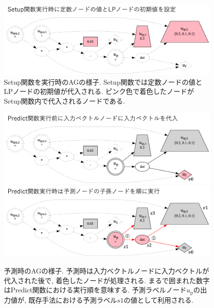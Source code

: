\documentclass[11pt,oneside,openany,report]{jsbook}
\begin{document}
\begin{figure}
  \centering
  \includegraphics[width=14cm]{mgg_automl_zero_vag/ag/setup.png}
  \caption{Setup関数を実行時のAGの様子. Setup関数では定数ノードの値とLPノードの初期値が代入される. ピンク色で着色したノードがSetup関数内で代入されるノードである. }
  \label{fig:mgg_automl_zero_vag:setup}
\end{figure}
\begin{figure}
  \includegraphics[width=14cm]{mgg_automl_zero_vag/ag/before_predict.png}
  \includegraphics[width=14cm]{mgg_automl_zero_vag/ag/predict.png}
  \caption{予測時のAGの様子. 予測時は入力ベクトルノードに入力ベクトルが代入された後で, 着色したノードが処理される. まるで囲まれた数字はPredict関数における実行順を意味する. 予測ラベルノード$u_\mathrm{p}$の出力値が, 既存手法における予測ラベル$s1$の値として利用される.}
  \label{fig:mgg_automl_zero_vag:predict}
\end{figure}
\end{document}
